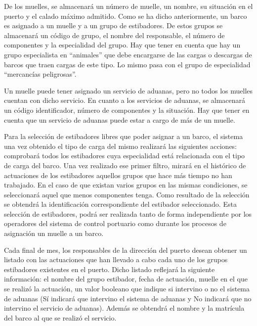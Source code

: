 \documentclass{db-practice}
\begin{document}
De los muelles, se almacenará un número de muelle, un nombre, su situación en el puerto y el calado máximo admitido. Como se ha dicho anteriormente, un barco es asignado a un muelle y a un grupo de estibadores. De estos grupos se almacenará un código de grupo, el nombre del responsable, el número de componentes y la especialidad del grupo. Hay que tener en cuenta que hay un grupo especialista en “animales” que debe encargarse de las cargas o descargas de barcos que traen cargas de este tipo. Lo mismo pasa con el grupo de especialidad “mercancías peligrosas”.

Un muelle puede tener asignado un servicio de aduanas, pero no todos los muelles cuentan con dicho servicio. En cuanto a los servicios de aduanas, se almacenará un código identificador, número de componentes y la situación. Hay que tener en cuenta que un servicio de aduanas puede estar a cargo de más de un muelle.

Para la selección de estibadores libres que poder asignar a un barco, el sistema una vez obtenido el tipo de carga del mismo realizará las siguientes acciones: comprobará todos los estibadores cuya especialidad está relacionada con el tipo de carga del barco. Una vez realizado ese primer filtro, mirará en el histórico de actuaciones de los estibadores aquellos grupos que hace más tiempo no han trabajado. En el caso de que existan varios grupos en las mismas condiciones, se seleccionará aquel que menos componentes tenga. Como resultado de la selección se obtendrá la identificación correspondiente del estibador seleccionado. Esta selección de estibadores, podrá ser realizada tanto de forma independiente por los operadores del sistema de control portuario como durante los procesos de asignación un muelle a un barco.

Cada final de mes, los responsables de la dirección del puerto desean obtener un listado con las actuaciones que han llevado a cabo cada uno de los grupos estibadores existentes en el puerto. Dicho listado reflejará la siguiente información: el nombre del grupo estibador, fecha de actuación, muelle en el que se realizó la actuación, un valor booleano que indique si intervino o no el sistema de aduanas (Sí indicará que intervino el sistema de aduanas y No indicará que no intervino el servicio de aduanas). Además se obtendrá el nombre y la matrícula del barco al que se realizó el servicio.
\end{document}
